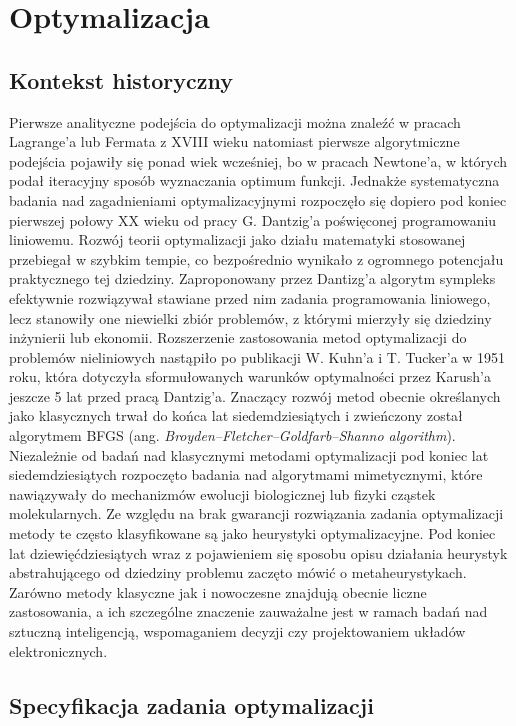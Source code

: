 \newpage
\section{Optymalizacja \label{sec:optim}}
\subsection{Kontekst historyczny \label{subsec:hist}}
    Pierwsze analityczne podejścia do optymalizacji można znaleźć w pracach Lagrange'a lub Fermata z XVIII wieku natomiast pierwsze algorytmiczne podejścia pojawiły się ponad wiek wcześniej, bo w pracach Newtone'a, w których podał iteracyjny sposób wyznaczania optimum funkcji. Jednakże systematyczna badania nad zagadnieniami optymalizacyjnymi rozpoczęło się dopiero pod koniec pierwszej połowy XX wieku od pracy G. Dantzig'a poświęconej programowaniu liniowemu. Rozwój teorii optymalizacji jako działu matematyki stosowanej przebiegał w szybkim tempie, co bezpośrednio wynikało z ogromnego potencjału praktycznego tej dziedziny. Zaproponowany przez Dantizg'a algorytm sympleks efektywnie rozwiązywał stawiane przed nim zadania programowania liniowego, lecz stanowiły one niewielki zbiór problemów, z którymi mierzyły się dziedziny inżynierii lub ekonomii. Rozszerzenie zastosowania metod optymalizacji do problemów nieliniowych nastąpiło po publikacji W. Kuhn'a i T. Tucker'a w 1951 roku, która dotyczyła sformułowanych warunków optymalności przez Karush'a jeszcze 5 lat przed pracą Dantzig'a. Znaczący rozwój metod obecnie określanych jako klasycznych trwał do końca lat siedemdziesiątych i zwieńczony został algorytmem BFGS (ang. \textit{Broyden–Fletcher–Goldfarb–Shanno algorithm}). Niezależnie od badań nad klasycznymi metodami optymalizacji pod koniec lat siedemdziesiątych rozpoczęto badania nad algorytmami mimetycznymi, które nawiązywały do mechanizmów ewolucji biologicznej lub fizyki cząstek molekularnych. Ze względu na brak gwarancji rozwiązania zadania optymalizacji metody te często klasyfikowane są jako heurystyki optymalizacyjne. Pod koniec lat dziewięćdziesiątych wraz z pojawieniem się sposobu opisu działania heurystyk abstrahującego od dziedziny problemu zaczęto mówić o metaheurystykach. 
    Zarówno metody klasyczne jak i nowoczesne znajdują obecnie liczne zastosowania, a ich szczególne znaczenie zauważalne jest w ramach badań nad sztuczną inteligencją, wspomaganiem decyzji czy projektowaniem układów elektronicznych.
\subsection{Specyfikacja zadania optymalizacji \label{subsec:specOptim}}

